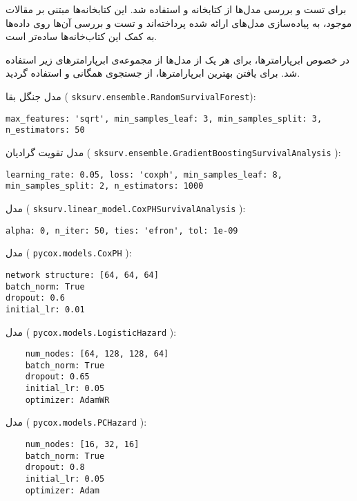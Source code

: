 
برای تست و بررسی مدل‌ها از کتابخانه  و  استفاده شد. این کتابخانه‌ها مبتنی بر مقالات موجود، به پیاده‌سازی مدل‌های ارائه شده پرداخته‌اند و تست و بررسی آن‌ها روی داده‌ها به کمک این کتاب‌خانه‌ها ساده‌تر است.

در خصوص ابرپارامترها، برای هر یک از مدل‌ها از مجموعه‌ی ابرپارامترهای زیر استفاده شد. برای یافتن بهترین ابرپارامترها، از جستجوی همگانی و  استفاده گردید.

 مدل جنگل بقا 
(
\texttt{sksurv.ensemble.RandomSurvivalForest}):
\begin{latin}
\footnotesize
\begin{verbatim}
max_features: 'sqrt', min_samples_leaf: 3, min_samples_split: 3, n_estimators: 50
\end{verbatim}\end{latin}
مدل تقویت گرادیان 
(
\texttt{sksurv.ensemble.GradientBoostingSurvivalAnalysis}
):
\begin{latin}
\footnotesize
\begin{verbatim}
learning_rate: 0.05, loss: 'coxph', min_samples_leaf: 8, min_samples_split: 2, n_estimators: 1000
\end{verbatim}\end{latin}
مدل 
( 
\texttt{sksurv.linear\_model.CoxPHSurvivalAnalysis}
):
\begin{latin}
\footnotesize
\begin{verbatim}
alpha: 0, n_iter: 50, ties: 'efron', tol: 1e-09
\end{verbatim}\end{latin}
مدل 
(
\texttt{pycox.models.CoxPH}
):
\begin{latin}
\footnotesize
\begin{verbatim}
network structure: [64, 64, 64]
batch_norm: True
dropout: 0.6
initial_lr: 0.01
\end{verbatim}
\end{latin}
مدل 
(
\texttt{pycox.models.LogisticHazard}
):
\begin{latin}
	\footnotesize
	\begin{verbatim}
	num_nodes: [64, 128, 128, 64]
	batch_norm: True
	dropout: 0.65
	initial_lr: 0.05
	optimizer: AdamWR
	\end{verbatim}
\end{latin}
مدل 
(
\texttt{pycox.models.PCHazard}
):
\begin{latin}
	\footnotesize
	\begin{verbatim}
	num_nodes: [16, 32, 16]
	batch_norm: True
	dropout: 0.8
	initial_lr: 0.05
	optimizer: Adam
	\end{verbatim}
\end{latin}

